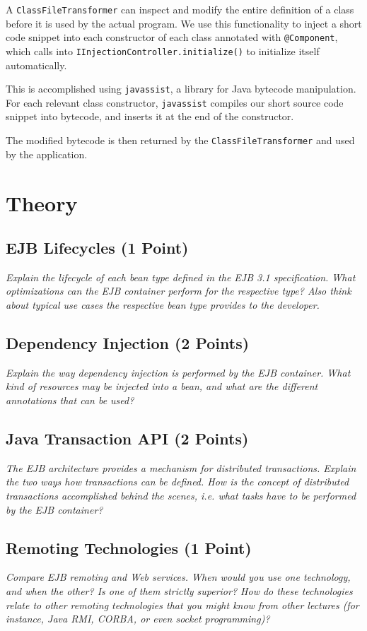 \documentclass[a4paper,10pt]{article}
\begin{document}
A \lstinline|ClassFileTransformer| can inspect and modify the entire definition of
a class before it is used by the actual program. We use this functionality to
inject a short code snippet into each constructor of each class annotated with \lstinline|@Component|,
which calls into \lstinline|IInjectionController.initialize()| to initialize itself
automatically.

This is accomplished using \verb|javassist|, a library for Java bytecode manipulation.
For each relevant class constructor, \verb|javassist| compiles our short source
code snippet into bytecode, and inserts it at the end of the constructor.

The modified bytecode is then returned by the \lstinline|ClassFileTransformer| and
used by the application.


\section{Theory}

\subsection{EJB Lifecycles (1 Point)}

\emph{
Explain the lifecycle of each bean type defined in the EJB 3.1 specification. What optimizations can the
EJB container perform for the respective type? Also think about typical use cases the respective bean
type provides to the developer.}

\subsection{Dependency Injection (2 Points)}

\emph{
Explain the way dependency injection is performed by the EJB container. What kind of resources may
be injected into a bean, and what are the different annotations that can be used?}

\subsection{Java Transaction API (2 Points)}

\emph{
The EJB architecture provides a mechanism for distributed transactions. Explain the two ways how
transactions can be defined. How is the concept of distributed transactions accomplished behind the
scenes, i.e. what tasks have to be performed by the EJB container?}

\subsection{Remoting Technologies (1 Point)}

\emph{Compare EJB remoting and Web services. When would you use one technology, and when the other? Is
one of them strictly superior? How do these technologies relate to other remoting technologies that you
might know from other lectures (for instance, Java RMI, CORBA, or even socket programming)?}
\end{document}
